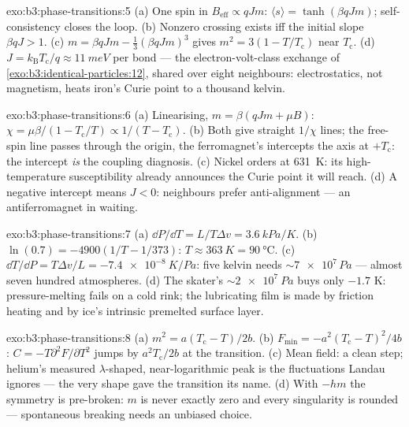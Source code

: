 \begin{solution}{exo:b3:phase-transitions:5}
(a) One spin in $B_{\text{eff}} \propto qJm$: $\langle s\rangle =
\tanh(\beta qJm)$; self-consistency closes the loop. (b) Nonzero
crossing exists iff the initial slope $\beta qJ > 1$. (c) $m =
\beta qJm - \tfrac13(\beta qJm)^3$ gives $m^2 = 3(1 -
T/T_{\text{c}})$ near $T_{\text{c}}$. (d) $J =
k_{\text{B}}T_{\text{c}}/q \approx \qty{11}{meV}$ per bond ---
the electron-volt-class exchange of
\cref{exo:b3:identical-particles:12}, shared over eight
neighbours: electrostatics, not magnetism, heats iron's Curie
point to a thousand kelvin.
\end{solution}

\begin{solution}{exo:b3:phase-transitions:6}
(a) Linearising, $m = \beta(qJm + \mu B)$: $\chi =
\mu\beta/(1 - T_{\text{c}}/T) \propto 1/(T - T_{\text{c}})$. (b)
Both give straight $1/\chi$ lines; the free-spin line passes
through the origin, the ferromagnet's intercepts the axis at
$+T_{\text{c}}$: the intercept \emph{is} the coupling
diagnosis. (c) Nickel orders at \qty{631}{K}: its high-temperature
susceptibility already announces the Curie point it will reach.
(d) A negative intercept means $J < 0$: neighbours prefer
anti-alignment --- an antiferromagnet in waiting.
\end{solution}

\begin{solution}{exo:b3:phase-transitions:7}
(a) $\dd P/\dd T = L/T\Delta v = \qty{3.6}{kPa/K}$. (b)
$\ln(0.7) = -4900(1/T - 1/373)$: $T \approx \qty{363}{K} =
\qty{90}{\celsius}$. (c) $\dd T/\dd P = T\Delta v/L =
\qty{-7.4e-8}{K/Pa}$: five kelvin needs $\sim\num{7e7}\,\unit{Pa}$
--- almost seven hundred atmospheres. (d) The skater's
$\sim\qty{2e7}{Pa}$ buys only $-1.7$ K: pressure-melting fails on
a cold rink; the lubricating film is made by friction heating and
by ice's intrinsic premelted surface layer.
\end{solution}

\begin{solution}{exo:b3:phase-transitions:8}
(a) $m^2 = a(T_{\text{c}} - T)/2b$. (b) $F_{\min} =
-a^2(T_{\text{c}} - T)^2/4b$: $C = -T\partial^2F/\partial T^2$
jumps by $a^2T_{\text{c}}/2b$ at the transition. (c) Mean field:
a clean step; helium's measured $\lambda$-shaped, near-logarithmic
peak is the fluctuations Landau ignores --- the very shape gave
the transition its name. (d) With $-hm$ the symmetry is
pre-broken: $m$ is never exactly zero and every singularity is
rounded --- spontaneous breaking needs an unbiased choice.
\end{solution}

